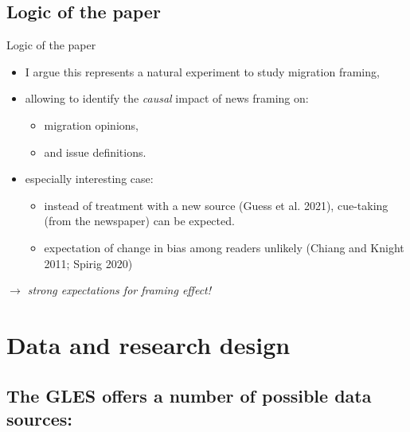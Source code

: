 \documentclass[
  ignorenonframetext,
]{beamer}
\providecommand{\tightlist}{%
  \setlength{\itemsep}{0pt}\setlength{\parskip}{0pt}}
\begin{document}
\hypertarget{logic-of-the-paper}{%
\subsection{Logic of the paper}\label{logic-of-the-paper}}

\begin{frame}{Logic of the paper}
\begin{itemize}
\tightlist
\item
  I argue this represents a natural experiment to study migration
  framing,
\item
  allowing to identify the \emph{causal} impact of news framing on:

  \begin{itemize}
  \tightlist
  \item
    migration opinions,
  \item
    and issue definitions.
  \end{itemize}
\item
  especially interesting case:

  \begin{itemize}
  \tightlist
  \item
    instead of treatment with a new source (Guess et al. 2021),
    cue-taking (from the newspaper) can be expected.
  \item
    expectation of change in bias among readers unlikely (Chiang and
    Knight 2011; Spirig 2020)
  \end{itemize}
\end{itemize}

\emph{\(\rightarrow\) strong expectations for framing effect!}
\end{frame}

\hypertarget{data-and-research-design}{%
\section{Data and research design}\label{data-and-research-design}}

\hypertarget{the-gles-offers-a-number-of-possible-data-sources}{%
\subsection{The GLES offers a number of possible data
sources:}\label{the-gles-offers-a-number-of-possible-data-sources}}
\end{document}
